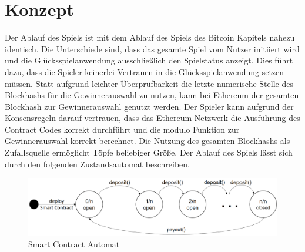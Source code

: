 \section{Konzept} \label{eth_konzept}

Der Ablauf des Spiels ist mit dem Ablauf des Spiels des Bitcoin Kapitels nahezu identisch. Die Unterschiede sind, dass das gesamte Spiel vom Nutzer initiiert wird und die Glücksspielanwendung ausschließlich den Spielstatus anzeigt. Dies führt dazu, dass die Spieler keinerlei Vertrauen in die Glücksspielanwendung setzen müssen. Statt aufgrund leichter Überprüfbarkeit die letzte numerische Stelle des Blockhashs für die Gewinnerauswahl zu nutzen, kann bei Ethereum der gesamten Blockhash zur Gewinnerauswahl genutzt werden. Der Spieler kann aufgrund der Konsensregeln darauf vertrauen, dass das Ethereum Netzwerk die Ausführung des Contract Codes korrekt durchführt und die modulo Funktion zur Gewinnerauswahl korrekt berechnet. Die Nutzung des gesamten Blockhashs als Zufallsquelle ermöglicht Töpfe beliebiger Größe. 
Der Ablauf des Spiels lässt sich durch den folgenden Zustandsautomat beschreiben.

\begin{figure}[H]
\centering
\includegraphics[width=1\linewidth]{Figures/umsetzung_eth/smart_contract_automat_idea}
\decoRule
\caption{Smart Contract Automat}
\label{fig:smart_contract_automat_idea}
\end{figure}

